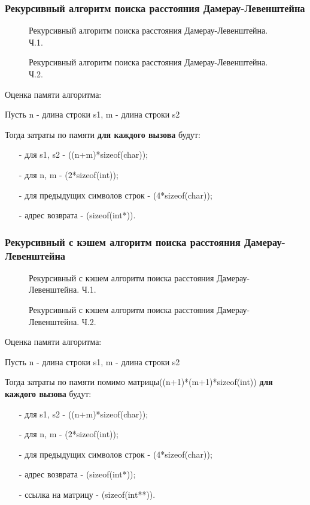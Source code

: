 \subsubsection{Рекурсивный алгоритм поиска расстояния Дамерау-Левенштейна}
\begin{figure}[!h]
	\centering
	\captionsetup{justification=centering}
	
	\caption{Рекурсивный алгоритм поиска расстояния Дамерау-Левенштейна. Ч.1.}
	\label{fig:d31}
\end{figure}
\begin{figure}[h]
	\centering
	\captionsetup{justification=centering}
	
	\caption{Рекурсивный алгоритм поиска расстояния Дамерау-Левенштейна. Ч.2.}
	\label{fig:d32}
\end{figure}
\pagebreak
Оценка памяти алгоритма:\par
Пусть n - длина строки s1, m - длина строки s2\par
Тогда затраты по памяти \textbf{для каждого вызова} будут:\par
\begin{itemize}
	\item[-] для s1, s2 - ((n+m)*sizeof(char));
	\item[-] для n, m - (2*sizeof(int));
	\item[-] для предыдущих символов строк - (4*sizeof(char));
	\item[-] адрес возврата - (sizeof(int*)).
\end{itemize}
\pagebreak

\subsubsection{Рекурсивный с кэшем алгоритм поиска расстояния Дамерау-Левенштейна}
\begin{figure}[!h]
	\centering
	\captionsetup{justification=centering}
	
	\caption{Рекурсивный с кэшем алгоритм поиска расстояния Дамерау-Левенштейна. Ч.1.}
	\label{fig:d41}
\end{figure}
\begin{figure}[h]
	\centering
	\captionsetup{justification=centering}
	
	\caption{Рекурсивный с кэшем алгоритм поиска расстояния Дамерау-Левенштейна. Ч.2.}
	\label{fig:d42}
\end{figure}
\pagebreak
Оценка памяти алгоритма:\par
Пусть n - длина строки s1, m - длина строки s2\par
Тогда затраты по памяти помимо матрицы((n+1)*(m+1)*sizeof(int)) \textbf{для каждого вызова} будут:\par
\begin{itemize}
	\item[-] для s1, s2 - ((n+m)*sizeof(char));
	\item[-] для n, m - (2*sizeof(int));
	\item[-] для предыдущих символов строк - (4*sizeof(char));
	\item[-] адрес возврата - (sizeof(int*));
	\item[-] ссылка на матрицу - (sizeof(int**)).
\end{itemize}
\pagebreak